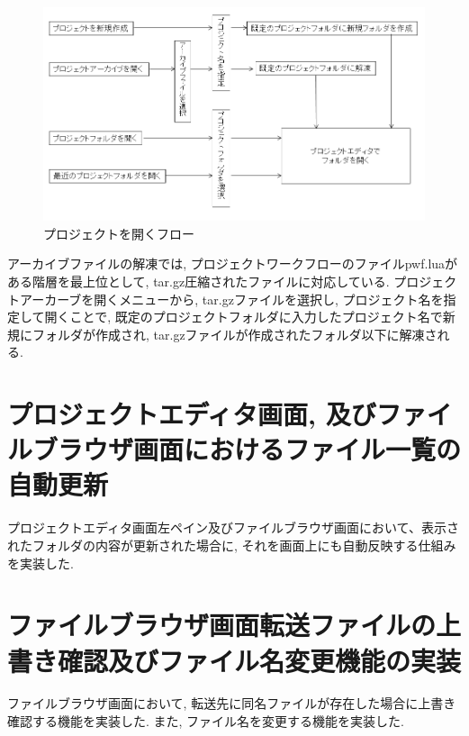 \documentclass[a4paper,10pt,oneside]{jsbook}
\begin{document}
\begin{figure}[htbp]
	\begin{center}
		\includegraphics[width=12.0cm]{image/projectopenflow.png}
	\end{center}
	\caption{プロジェクトを開くフロー}
	\label{fig:projectopenflow}
\end{figure}

アーカイブファイルの解凍では, プロジェクトワークフローのファイルpwf.luaがある階層を最上位として, tar.gz圧縮されたファイルに対応している. プロジェクトアーカーブを開くメニューから, tar.gzファイルを選択し, プロジェクト名を指定して開くことで, 既定のプロジェクトフォルダに入力したプロジェクト名で新規にフォルダが作成され, tar.gzファイルが作成されたフォルダ以下に解凍される.

\section{プロジェクトエディタ画面, 及びファイルブラウザ画面におけるファイル一覧の自動更新}
プロジェクトエディタ画面左ペイン及びファイルブラウザ画面において、表示されたフォルダの内容が更新された場合に, それを画面上にも自動反映する仕組みを実装した.

\section{ファイルブラウザ画面転送ファイルの上書き確認及びファイル名変更機能の実装}
ファイルブラウザ画面において, 転送先に同名ファイルが存在した場合に上書き確認する機能を実装した. また, ファイル名を変更する機能を実装した. 
\end{document}
